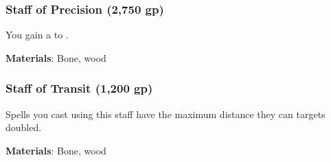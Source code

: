 \lowercase{\hypertarget{item:Staff of Precision}{}}\label{item:Staff of Precision}
\hypertarget{item:Staff of Precision}{\subsubsection{Staff of Precision\hfill{} (2,750 gp)}}

You gain a   to .



\vspace{0.25em}
\textbf{Materials}: Bone, wood


\lowercase{\hypertarget{item:Staff of Transit}{}}\label{item:Staff of Transit}
\hypertarget{item:Staff of Transit}{\subsubsection{Staff of Transit\hfill{} (1,200 gp)}}

Spells you cast using this staff have the maximum distance they can  targets doubled.



\vspace{0.25em}
\textbf{Materials}: Bone, wood
